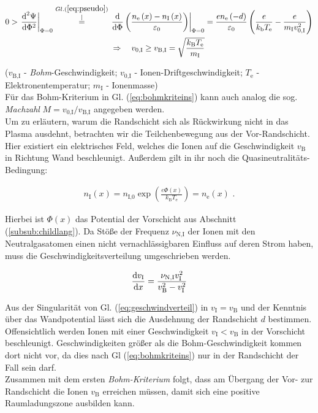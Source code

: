 \documentclass[numbers=noenddot,a4paper]{scrartcl}
\newcommand{\diff}{\textnormal{d}}
\newcommand{\ix}[1]{_\text{#1}}
\newcommand{\tilt}[1]{\textit{#1}}
\begin{document}
				\begin{align}
					0>\left.\frac{\diff^{2}\Psi}{\diff\Phi^{2}}\right|_{\Phi=0}\overset{Gl. (\ref{eq:pseudo})}{\overset{\mid}{=}}\left.\frac{\diff}{\diff\Phi}\left(\frac{n\ix{e}\left(x\right)-n\ix{I}\left(x\right)}{\varepsilon\ix{0}}\right)\right|_{\Phi=0}&=\frac{en\ix{e}\left(-d\right)}{\varepsilon\ix{0}}\left(\frac{e}{k\ix{b}T\ix{e}}-\frac{e}{m\ix{I}v\ix{0,I}^{2}}\right) \label{eq:beding} \\
					\Rightarrow \quad v\ix{0,I}\ge v\ix{B,I}=\sqrt{\frac{k\ix{B}T\ix{e}}{m\ix{I}}}& \label{eq:bohmkriteins}
				\end{align}
				
			($v\ix{B,I}$ - \tilt{Bohm}-Geschwindigkeit; $v\ix{0,I}$ - Ionen-Driftgeschwindigkeit; $T\ix{e}$ - Elektronentemperatur; $m\ix{I}$ - Ionenmasse)\\
			Für das Bohm-Kriterium in Gl. (\ref{eq:bohmkriteins}) kann auch analog die sog. \tilt{Machzahl} $M=v\ix{0,I}/v\ix{B,I}$ angegeben werden.\\
			Um zu erläutern, warum die Randschicht sich als Rückwirkung nicht in das Plasma ausdehnt, betrachten wir die Teilchenbewegung aus der Vor-Randschicht. Hier existiert ein elektrisches Feld, welches die Ionen auf die Geschwindigkeit $v\ix{B}$ in Richtung Wand beschleunigt. Außerdem gilt in ihr noch die Quasineutralitäts-Bedingung:
			
				\begin{align}
					n\ix{I}\left(x\right)=n\ix{I,0}\exp\left(\frac{e\Phi\left(x\right)}{k\ix{B}T\ix{e}}\right)=n\ix{e}\left(x\right)\,\, .
				\end{align}
				
			Hierbei ist $\Phi\left(x\right)$ das Potential der Vorschicht aus Abschnitt  (\ref{subsub:childlang}). 
			Da Stöße der Frequenz $\nu\ix{N,I}$ der Ionen mit den Neutralgasatomen einen nicht vernachlässigbaren Einfluss auf deren Strom haben, muss die Geschwindigkeitsverteilung umgeschrieben werden.
			
				\begin{align}
					\frac{\diff v\ix{I}}{\diff x}=\frac{\nu\ix{N,I}v\ix{I}^2}{v\ix{B}^2-v\ix{I}^2} \label{eq:geschwindverteil}
				\end{align}
				
			Aus der Singularität von Gl. (\ref{eq:geschwindverteil}) in $v\ix{I}=v\ix{B}$ und der Kenntnis über das Wandpotential lässt sich die Ausdehnung der Randschicht $d$ bestimmen. Offensichtlich werden Ionen mit einer Geschwindigkeit $v\ix{I}<v\ix{B}$ in der Vorschicht beschleunigt. Geschwindigkeiten größer als die Bohm-Geschwindigkeit kommen dort nicht vor, da dies nach Gl (\ref{eq:bohmkriteins}) nur in der Randschicht der Fall sein darf. \\
			Zusammen mit dem ersten \tilt{Bohm-Kriterium} folgt, dass am Übergang der Vor- zur Randschicht die Ionen $v\ix{B}$ erreichen müssen, damit sich eine positive Raumladungszone ausbilden kann.
			
\end{document}

